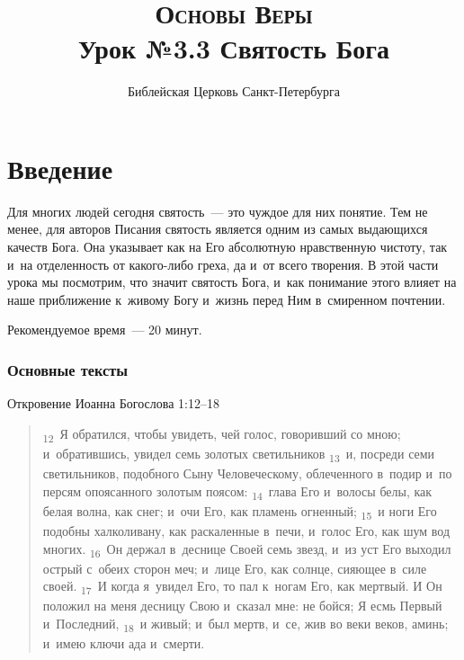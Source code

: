 \documentclass[a4paper,12pt]{article}
\title{\textsc{Основы Веры}\\Урок №3.3 Святость Бога}
\author{Библейская Церковь Санкт-Петербурга}
\date{}
\begin{document}
\maketitle

\thispagestyle{empty}

\tableofcontents



\section*{Введение}

Для многих людей сегодня святость~--- это чуждое для них понятие. Тем не менее, для авторов Писания святость является одним из самых выдающихся качеств Бога. Она указывает как на Его абсолютную нравственную чистоту, так и~на отделенность от какого-либо греха, да и~от всего творения. В этой части урока мы посмотрим, что значит святость Бога, и~как понимание этого влияет на наше приближение к~живому Богу и~жизнь перед Ним в~смиренном почтении.

Рекомендуемое время~--- 20 минут.
        
\subsubsection*{Основные тексты}

\noindent Откровение Иоанна Богослова 1:12--18

\begin{quote}
\textsubscript{12}~Я обратился, чтобы увидеть, чей голос, говоривший со мною; и~обратившись, увидел семь золотых светильников 
\textsubscript{13}~и, посреди семи светильников, подобного Сыну Человеческому, облеченного в~подир и~по персям опоясанного золотым поясом: 
\textsubscript{14}~глава Его и~волосы белы, как белая волна, как снег; и~очи Его, как пламень огненный; 
\textsubscript{15}~и ноги Его подобны халколивану, как раскаленные в~печи, и~голос Его, как шум вод многих. 
\textsubscript{16}~Он держал в~деснице Своей семь звезд, и~из уст Его выходил острый с~обеих сторон меч; и~лице Его, как солнце, сияющее в~силе своей. 
\textsubscript{17}~И когда я~увидел Его, то пал к~ногам Его, как мертвый. И Он положил на меня десницу Свою и~сказал мне: не бойся; Я есмь Первый и~Последний, 
\textsubscript{18}~и живый; и~был мертв, и~се, жив во веки веков, аминь; и~имею ключи ада и~смерти. 

\end{quote}
\end{document}
